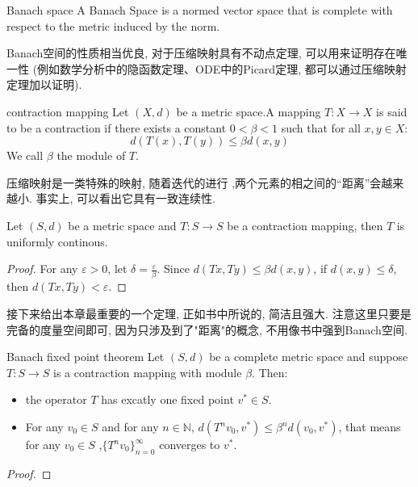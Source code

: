 \begin{definition}{Banach space}
    A Banach Space is a normed vector space that is complete with respect to the metric induced by the norm.
\end{definition}
Banach空间的性质相当优良, 对于压缩映射具有不动点定理, 可以用来证明存在唯一性
(例如数学分析中的隐函数定理、ODE中的Picard定理, 都可以通过压缩映射定理加以证明).
\begin{definition}{contraction mapping}
    Let $(X,d)$ be a metric space.A mapping $T: X \to X$ is said to be a contraction if there exists a constant $0 < \beta < 1$ such that for all $x, y \in X$:
    $$d(T(x),T(y)) \leq \beta d(x,y)$$
    We call $\beta$ the module of $T$.
\end{definition}
压缩映射是一类特殊的映射, 随着迭代的进行 ,两个元素的相之间的“距离”会越来越小. 事实上, 可以看出它具有一致连续性.
\begin{lemma}
    Let $(S,d)$ be a metric space and $T:S\to S$ be a contraction mapping, then $T$ is uniformly continous. 
\end{lemma}
\begin{proof}
    For any $\varepsilon>0$, let $\delta = \frac{\varepsilon}{\beta}$. 
    Since $d(Tx,Ty)\leq \beta d(x,y)$, if $d(x,y)\leq \delta$, then $d(Tx,Ty)<\varepsilon$. 
\end{proof}
\newpage

接下来给出本章最重要的一个定理, 正如书中所说的, 简洁且强大.
注意这里只要是完备的度量空间即可, 因为只涉及到了"距离"的概念, 不用像书中强到Banach空间.
\begin{theorem}{Banach fixed point theorem}
    Let $(S,d)$ be a complete metric space and suppose $T:S\to S$ is a contraction mapping with module $\beta$. Then:
    \begin{itemize}
        \item the operator $T$ has excatly one fixed point $v^*\in S$.
        \item For any $v_0\in S$ and for any $n\in\mathbb{N}$, $d(T^nv_0,v^*)\leq \beta^nd(v_0,v^*)$, that means for any $v_0\in S$ ,$\{T^nv_0\}_{n=0}^{\infty}$ converges to $v^*$.
    \end{itemize}
\end{theorem}
\begin{proof}

\end{proof}
\newpage

